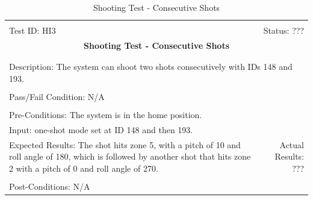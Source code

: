 \documentclass[11pt]{article}
\begin{document}
\begin{center}
\begin{table}[H]
\begin{tabular}{|l r|}\hline&\\[-2mm]
	Test ID: HI3	&Status: ???\\[-3mm]
	\multicolumn{2}{|c|}{\textbf{\large{Shooting Test - Consecutive Shots}}}\\&\\\hline&\\[-3mm]
	\multicolumn{2}{|p{\textwidth}|}{Description: The system can shoot two shots consecutively with IDs 148 and 193.}\\[1mm]\hline&\\[-3mm]
	\multicolumn{2}{|p{\textwidth}|}{Pass/Fail Condition: N/A}\\[1mm]\hline&\\[-3mm]
	\multicolumn{2}{|p{\textwidth}|}{Pre-Conditions: The system is in the home position.}\\[4mm]
	\multicolumn{2}{|p{\textwidth}|}{Input: one-shot mode set at ID 148 and then 193.}\\[2mm]\hline
	\multicolumn{1}{|p{0.49\textwidth}}{Expected Results: The shot hits zone 5, with a pitch of 10 and roll angle of 180, which is followed by another shot that hits zone 2 with a pitch of 0 and roll angle of 270. }	&\multicolumn{1}{|p{0.45\textwidth}|}{Actual Results: ???}\\\hline&\\[-3mm]
	\multicolumn{2}{|p{\textwidth}|}{Post-Conditions: N/A}\\\hline
\end{tabular}
\caption{Shooting Test - Consecutive Shots}
\end{table}
\end{center}
\end{document}

